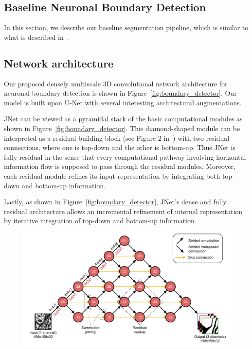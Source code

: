 \documentclass{article}
\begin{document}
\begin{appendices}

\section{Baseline Neuronal Boundary Detection}
\label{appendix:baseline}

In this section, we describe our baseline segmentation pipeline, which is similar to what is described in~\cite{kisuk}.

\subsection{Network architecture}

Our proposed densely multiscale 3D convolutional network architecture for
neuronal boundary detection is shown in Figure~\ref{fig:boundary_detector}. Our
model is built upon U-Net with several interesting architectural augmentations.


JNet can be viewed as a pyramidal stack of the basic computational modules as
shown in Figure~\ref{fig:boundary_detector}. This diamond-shaped module can be
interpreted as a residual building block (see Figure 2 in~\cite{resnet}) with
two residual connections, where one is top-down and the other is bottom-up. Thus
JNet is fully residual in the sense that every computational pathway involving
horizontal information flow is supposed to pass through the residual modules.
Moreover, each residual module refines its input representation by integrating
both top-down and bottom-up information.

Lastly, as shown in Figure~\ref{fig:boundary_detector}, JNet's dense and fully
residual architecture allows an incremental refinement of internal
representation by iterative integration of top-down and bottom-up information.

\begin{figure}[!b]
\centering
\includegraphics[width=1.0\linewidth]{baseline.pdf}


\end{figure}
\end{appendices}
\end{document}
